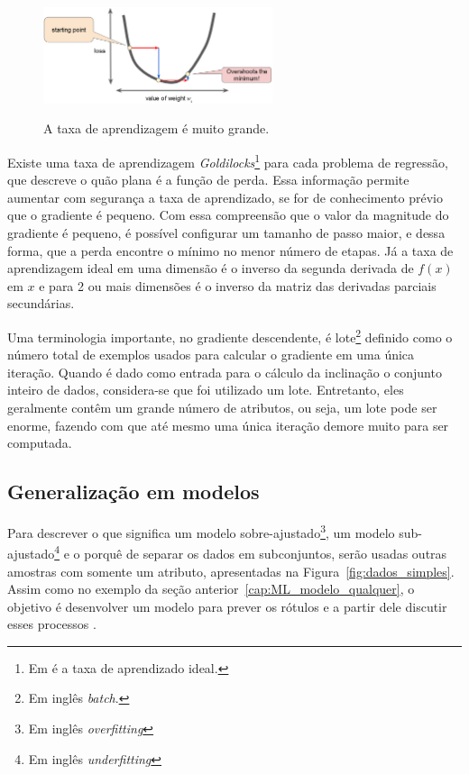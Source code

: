             \begin{figure}[H]
                \centering
                \caption{A taxa de aprendizagem é muito grande.}
                \includegraphics[width=0.6\textwidth]{fig/2-fundamentacao/aprendizado/taxa_grande.png}
                \label{fig:taxa_grande}
            \end{figure}
            
            Existe uma taxa de aprendizagem \textit{Goldilocks}\footnote{Em \rns\textit{ }é a taxa de aprendizado ideal.} para cada problema de regressão, que descreve o quão plana é a função de perda. Essa informação permite aumentar com segurança a taxa de aprendizado, se for de conhecimento prévio que o gradiente é pequeno. Com essa compreensão que o valor da magnitude do gradiente é pequeno, é possível configurar um tamanho de passo maior, e dessa forma, que a perda encontre o mínimo no menor número de etapas. Já a taxa de aprendizagem ideal em uma dimensão é o inverso da segunda derivada de $f(x)$ em $x$ e para 2 ou mais dimensões é o inverso da matriz das derivadas parciais secundárias. 
            
            Uma terminologia importante, no gradiente descendente, é lote\footnote{Em inglês \textit{batch}.} definido como o número total de exemplos usados para calcular o gradiente em uma única iteração. Quando é dado como entrada para o cálculo da inclinação o conjunto inteiro de dados, considera-se que foi utilizado um lote. Entretanto, eles geralmente contêm um grande número de atributos, ou seja, um lote pode ser enorme, fazendo com que até mesmo uma única iteração demore muito para ser computada.     
            
        \subsection{Generalização em modelos}
        
            Para descrever o que significa um modelo sobre-ajustado\footnote{Em inglês \textit{overfitting}}, um modelo sub-ajustado\footnote{Em inglês \textit{underfitting}} e o porquê de separar os dados em subconjuntos, serão usadas outras amostras com somente um atributo, apresentadas na Figura~\ref{fig:dados_simples}. Assim como no exemplo da seção anterior~\ref{cap:ML_modelo_qualquer}, o objetivo é desenvolver um modelo para prever os rótulos e a partir dele discutir esses processos \cite{kim2017matlab}.
    
